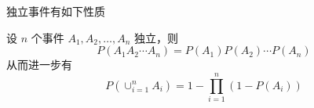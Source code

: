 \documentclass[12pt,a4paper]{amsart}
\begin{document}
独立事件有如下性质

\begin{proposition}
    设 $n$ 个事件 $A_1,A_2,\ldots,A_n$ 独立，则
    \begin{equation}
        P(A_1A_2\cdots A_n) = P(A_1)P(A_2)\cdots P(A_n)
    \end{equation}
    从而进一步有
    \begin{equation}
        P(\cup_{i=1}^n A_i) = 1 - \prod_{i=1}^n (1-P(A_i))
    \end{equation}
\end{proposition}

\appendix



{\footnotesize}
\end{document}
